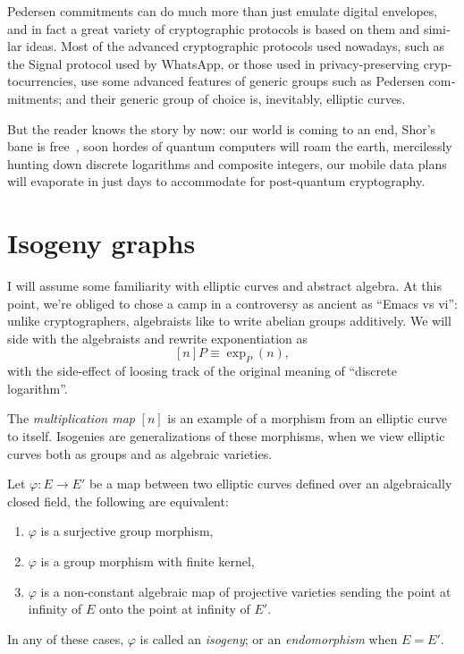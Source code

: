 \begin{otherlanguage}{english}
  Pedersen commitments can do much more than just emulate digital
  envelopes, and in fact a great variety of cryptographic protocols is
  based on them and similar ideas. Most of the advanced cryptographic
  protocols used nowadays, such as the Signal protocol used by
  WhatsApp, or those used in privacy-preserving cryptocurrencies, use
  some advanced features of generic groups such as Pedersen
  commitments; and their generic group of choice is, inevitably,
  elliptic curves.

  But the reader knows the story by now: our world is coming to an
  end, Shor's bane is free~\cite{FOCS:Shor94}, soon hordes of quantum
  computers will roam the earth, mercilessly hunting down discrete
  logarithms and composite integers, our mobile data plans will
  evaporate in just days to accommodate for post-quantum cryptography.

  \section{Isogeny graphs}
  I will assume some familiarity with elliptic curves and abstract
  algebra. At this point, we're obliged to chose a camp in a
  controversy as ancient as ``Emacs vs vi'': unlike cryptographers,
  algebraists like to write abelian groups additively. We will side
  with the algebraists and rewrite exponentiation as
  \[[n]P \equiv \exp_P(n),\] with the side-effect of loosing track of
  the original meaning of ``discrete logarithm''.

  The \emph{multiplication map} $[n]$ is an example of a morphism from
  an elliptic curve to itself.  Isogenies are generalizations of these
  morphisms, when we view elliptic curves both as groups and as
  algebraic varieties.

  \begin{definition}
    Let $\varphi:E\to E'$ be a map between two elliptic curves defined
    over an algebraically closed field, the following are equivalent:
    \begin{enumerate}
    \item $\varphi$ is a surjective group morphism,
    \item $\varphi$ is a group morphism with finite kernel,
    \item $\varphi$ is a non-constant algebraic map of projective
      varieties sending the point at infinity of $E$ onto the point at
      infinity of $E'$.
    \end{enumerate}
    In any of these cases, $\varphi$ is called an \emph{isogeny}; or
    an \emph{endomorphism} when $E=E'$.
  \end{definition}


\end{otherlanguage}
